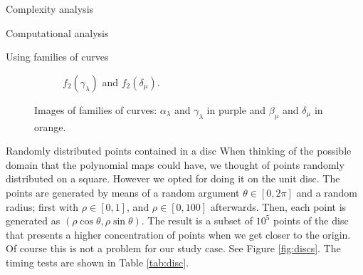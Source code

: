 \documentclass[11pt, a4paper, english, twoside, notitlepage, openright]{report}
\begin{document}
\begin{chapter}{Complexity analysis}
\begin{section}{Computational analysis}
\begin{subsection}{Using families of curves}
\begin{figure}
\begin{subfigure}{.45\linewidth}
\vspace{-0.4cm}\caption{$f_2(\gamma_{\lambda})$ and $f_2(\delta_{\mu})$.\label{fig:3curves3}}
\end{subfigure}
\vspace{-0.1cm}\caption[Images of families of curves for $g$ and $f_2$.]{Images of families of curves: $\alpha_{\lambda}$ and $\gamma_{\lambda}$ in purple and $\beta_{\mu}$ and $\delta_{\mu}$ in orange.\label{fig:curvesfg}}
\end{figure}

\end{subsection}

\begin{subsection}{Randomly distributed points contained in a disc}
When thinking of the possible domain that the polynomial maps could have, we thought of points randomly distributed on a square. However we opted for doing it on the unit disc. The points are generated by means of a random argument $\theta\in[0,2\pi]$ and a random radius; first with $\rho\in[0,1]$, and $\rho\in[0,100]$ afterwards. Then, each point is generated as $(\rho\cos\theta,\rho\sin\theta)$. The result is a subset of $10^5$ points of the disc that presents a higher concentration of points when we get closer to the origin. Of course this is not a problem for our study case. See Figure \ref{fig:discs}. The timing tests are shown in Table \ref{tab:disc}.


\end{subsection}
\end{section}
\end{chapter}
\end{document}
